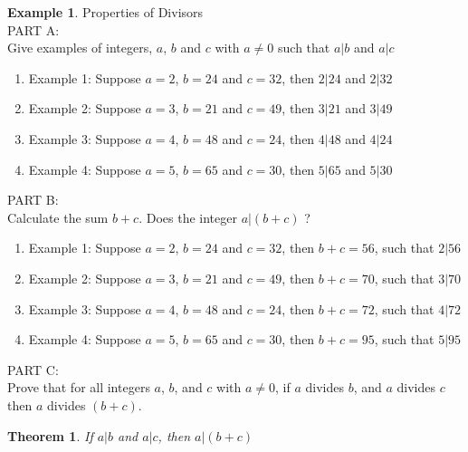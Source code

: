 \documentclass{book}
\newtheorem{theorem}{Theorem}[section]
\theoremstyle{definition}
\newtheorem{example}{Example}[definition]
\theoremstyle{remark}
\begin{document}
\begin{example}
Properties of Divisors\cite[Chap.3, P.C.3.2]{ted} \\

PART A: \\

Give examples of integers, $a$, $b$ and $c$ with $a \neq 0$ such that $a | b$ and $a | c$ \\ 

\begin{enumerate}
    \item Example 1: Suppose $a = 2$, $b = 24$ and $c = 32$, then $2 | 24$ and $2 | 32$
    \item Example 2: Suppose $a = 3$, $b = 21$ and $c = 49$, then $3 | 21$ and $3 | 49$
    \item Example 3: Suppose $a = 4$, $b = 48$ and $c = 24$, then $4 | 48$ and $4 | 24$
    \item Example 4: Suppose $a = 5$, $b = 65$ and $c = 30$, then $5 | 65$ and $5 | 30$    
\end{enumerate}


PART B: \\
Calculate the sum $b + c$. Does the integer $a | (b+c)$ ? \\

\begin{enumerate}
    \item Example 1: Suppose $a = 2$, $b = 24$ and $c = 32$, then $b + c = 56$, such that $2 | 56$
    \item Example 2: Suppose $a = 3$, $b = 21$ and $c = 49$, then $b + c = 70$, such that $3 | 70$
    \item Example 3: Suppose $a = 4$, $b = 48$ and $c = 24$, then $b + c = 72$, such that $4 | 72$
    \item Example 4: Suppose $a = 5$, $b = 65$ and $c = 30$, then $b + c = 95$, such that $5 | 95$
\end{enumerate}

PART C: \\
Prove that for all integers $a$, $b$, and $c$ with $a \neq 0$, if $a$ divides $b$, and $a$ divides $c$ then $a$ divides $(b+c)$. \\

\begin{tcolorbox}
	\begin{theorem}
		If $a | b$ and $a | c$, then $a | (b + c)$
	\end{theorem}
\end{tcolorbox}


\end{example}
\end{document}
